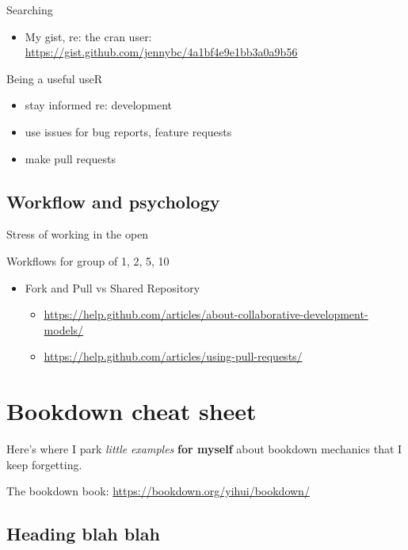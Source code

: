 \documentclass[
]{book}
\providecommand{\tightlist}{%
  \setlength{\itemsep}{0pt}\setlength{\parskip}{0pt}}
\begin{document}
Searching

\begin{itemize}
\tightlist
\item
  My gist, re: the cran user: \url{https://gist.github.com/jennybc/4a1bf4e9e1bb3a0a9b56}
\end{itemize}

Being a useful useR

\begin{itemize}
\tightlist
\item
  stay informed re: development
\item
  use issues for bug reports, feature requests
\item
  make pull requests
\end{itemize}

\section{Workflow and psychology}\label{workflow-and-psychology}

Stress of working in the open

Workflows for group of 1, 2, 5, 10

\begin{itemize}
\item
  Fork and Pull vs Shared Repository

  \begin{itemize}
  \tightlist
  \item
    \url{https://help.github.com/articles/about-collaborative-development-models/}
  \item
    \url{https://help.github.com/articles/using-pull-requests/}
  \end{itemize}
\end{itemize}

\chapter{Bookdown cheat sheet}\label{bookdown-cheat-sheet}

Here's where I park \emph{little} \emph{examples} \textbf{for myself} about bookdown mechanics that I keep forgetting.

The bookdown book: \url{https://bookdown.org/yihui/bookdown/}

\section{Heading blah blah}\label{heading-blah-blah}
\end{document}
